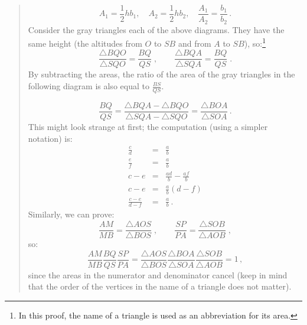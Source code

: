 \documentclass[11pt,a4paper]{article}
\newcommand*{\disfrac}[2]{\displaystyle\frac{#1}{#2}}
\begin{document}
\begin{quote}
\[
A_1 = \frac{1}{2}hb_1,\quad A_2 = \frac{1}{2}hb_2, \quad \frac{A_1}{A_2}=\frac{b_1}{b_2}\,.
\]
Consider the gray triangles each of the above diagrams. They have the same height (the altitudes from $O$ to $SB$ and from $A$ to $SB$), so:\footnote{In this proof, the name of a triangle is used as an abbreviation for its area.}
\[\frac{\triangle BQO}{\triangle SQO} = \frac{BQ}{QS}\;,\quad\quad \frac{\triangle BQA}{\triangle SQA} = \frac{BQ}{QS}\;.
\]
By subtracting the areas, the ratio of the area of the gray triangles in the following diagram is also equal to $\frac{BS}{QS}$.
\begin{center}
\vspace*{-8pt}
\vspace*{-6pt}
\end{center}
\[
\frac{BQ}{QS} = \frac{\triangle BQA - \triangle BQO}{\triangle SQA-\triangle SQO} = \frac{\triangle BOA}{\triangle SOA}\,.
\]
This might look strange at first; the computation (using a simpler notation) is:
\[
\renewcommand*{\arraystretch}{1.6}
\begin{array}{rcl}
 \disfrac{c}{d} &=&\disfrac{a}{b}\\
 \disfrac{e}{f} &=&\disfrac{a}{b}\\
c-e &=& \disfrac{ad}{b} - \disfrac{af}{b}\\
c-e &=& \disfrac{a}{b}(d-f)\\
\disfrac{c-e}{d-f} &=& \disfrac{a}{b}\,.
\end{array}
\]
Similarly, we can prove:
\[
\frac{AM}{MB} = \frac{\triangle AOS}{\triangle BOS}\;,\quad\quad \frac{SP}{PA} =\frac{\triangle SOB}{\triangle AOB}\;,
\]
so:
\[
\frac{AM}{MB}\frac{BQ}{QS}\frac{SP}{PA} = \frac{\triangle AOS}{\triangle BOS}\frac{\triangle BOA}{\triangle SOA}\frac{\triangle SOB}{\triangle AOB}=1\,,
\]
since the areas in the numerator and denominator cancel (keep in mind that the order of the vertices in the name of a triangle does not matter).
\vspace*{-8pt}
\end{quote}
\end{document}
